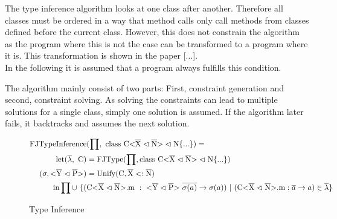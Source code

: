 The type inference algorithm looks at one class after another. Therefore all classes must be ordered in a way that method calls only call methods from classes defined before the current class.
However, this does not constrain the algorithm as the program where this is not the case can be transformed to a program where it is.
This transformation is shown in the paper [...].
\\
In the following it is assumed that a program always fulfills this condition.

The algorithm mainly consist of two parts:
First, constraint generation and second, constraint solving.
As solving the constraints can lead to multiple solutions for a single class, simply one solution is assumed. If the algorithm later fails, it backtracks and assumes the next solution.

\begin{figure}[H]
    \begin{align*}
        \text{FJTypeInference}&(\prod, \ \classheader \{ ... \}) = \\
        \text{let} (\overline{\lambda}, \ \text{C}) &= \text{FJType}(\prod, \classheader \{ ... \}) \\
        (\sigma, \yp) &= \text{Unify}(\text{C}, \overline{\text{X}} <: \overline{\text{N}}) \\
        \text{in} \prod \cup \ \{( & \cm \ : \ \yp \ \oto{\sigma(a)}) \ | \ (\cm : \oto{a} ) \in \overline{\lambda} \}
    \end{align*}
    \caption{Type Inference}
    \label{type_inference}
\end{figure}
